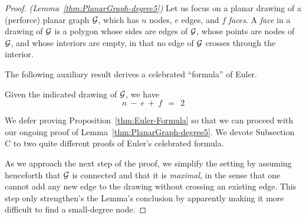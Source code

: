 \begin{proof} {\em (Lemma~\ref{thm:PlanarGraph-degree5})}
Let us focus on a planar drawing of a (perforce) planar graph $\mbox{$\cal G$}$,
which has $n$ nodes, $e$ edges, and $f$ {\it faces}.  A {\it face}
in a drawing of $\mbox{$\cal G$}$ is a polygon whose sides are edges of
$\mbox{$\cal G$}$, whose points are nodes of $\mbox{$\cal G$}$, and whose interiors are empty,
in that no edge of $\mbox{$\cal G$}$ crosses through the interior.
\bigskip

\noindent {}
\bigskip

The following auxiliary result derives a celebrated ``formula'' of
Euler.   

\begin{prop} 
\label{thm:Euler-Formula}
Given the indicated drawing of $\mbox{$\cal G$}$, we have
\begin{equation}
\label{eqn:Eulers-formula}
n \ - \ e \ + \ f \ \ = \ \ 2
\end{equation}
\end{prop}

\medskip

We defer proving Proposition~\ref{thm:Euler-Formula} so that we can
proceed with our ongoing proof of Lemma~\ref{thm:PlanarGraph-degree5}.
We devote Subsection C to two quite different proofs of Euler's
celebrated formula.

\medskip

As we approach the next step of the proof, we simplify the setting by
assuming henceforth that $\mbox{$\cal G$}$ is connected and that it is {\em
  maximal},  in the sense that one cannot
add any new edge to the drawing without crossing an existing edge.
This step only strengthen's the Lemma's conclusion by apparently
making it more difficult to find a small-degree node.


\end{proof}
